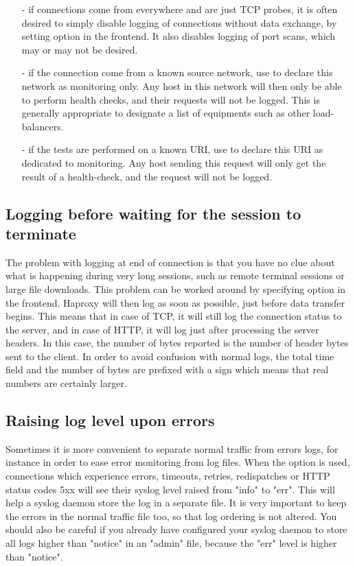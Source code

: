 \begin{itemize}
\item[-]
    if connections come from everywhere and are just TCP probes, it is often
    desired to simply disable logging of connections without data exchange, by
    setting option  in the frontend. It also disables logging of
    port scans, which may or may not be desired.
\item[-]
    if the connection come from a known source network, use  to
    declare this network as monitoring only. Any host in this network will then
    only be able to perform health checks, and their requests will not be
    logged. This is generally appropriate to designate a list of equipments
    such as other load-balancers.
\item[-]
    if the tests are performed on a known URI, use  to declare
    this URI as dedicated to monitoring. Any host sending this request will
    only get the result of a health-check, and the request will not be logged.
\end{itemize}

\subsection{Logging before waiting for the session to terminate}
\label{subsec:logging_before_waiting_session_terminate}

The problem with logging at end of connection is that you have no clue about
what is happening during very long sessions, such as remote terminal sessions
or large file downloads. This problem can be worked around by specifying
option  in the frontend. Haproxy will then log as soon as possible,
just before data transfer begins. This means that in case of TCP, it will still
log the connection status to the server, and in case of HTTP, it will log just
after processing the server headers. In this case, the number of bytes reported
is the number of header bytes sent to the client. In order to avoid confusion
with normal logs, the total time field and the number of bytes are prefixed
with a \chr{+} sign which means that real numbers are certainly larger.

\subsection{Raising log level upon errors}
\label{subsec:raising_log_level_upon_error}

Sometimes it is more convenient to separate normal traffic from errors logs,
for instance in order to ease error monitoring from log files. When the option
 is used, connections which experience errors, timeouts,
retries, redispatches or HTTP status codes 5xx will see their syslog level
raised from "info" to "err". This will help a syslog daemon store the log in
a separate file. It is very important to keep the errors in the normal traffic
file too, so that log ordering is not altered. You should also be careful if
you already have configured your syslog daemon to store all logs higher than
"notice" in an "admin" file, because the "err" level is higher than "notice".

